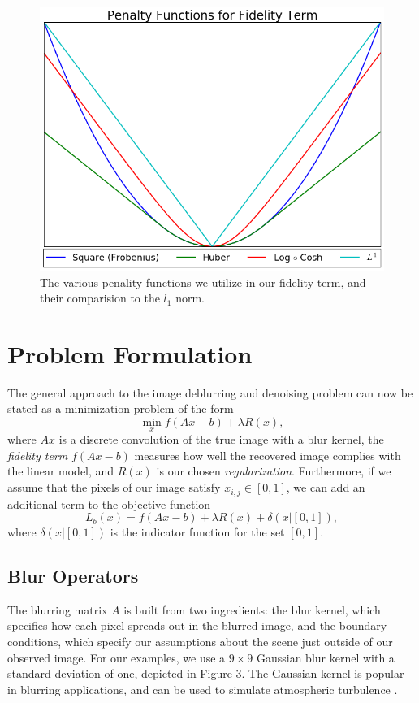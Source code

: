 \documentclass[10pt,a4paper]{article}
\begin{document}
	\begin{figure}[H]
		\centering
		\includegraphics[scale=.35]{../figures/penalty_functions.png} 
		\caption{The various penality functions we utilize in our fidelity term, and their comparision to the $l_1$ norm.}
	\end{figure}
	
	\newpage
	\section{Problem Formulation}
	The general approach to the image deblurring and denoising problem can now be stated as a minimization problem of the form
	\begin{equation} \label{general}
	\min_x f(Ax -b) + \lambda R(x),
	\end{equation}
	where $Ax$ is a discrete convolution of the true image with a blur kernel, the  \emph{fidelity term} $f(Ax-b)$ measures how well the recovered image complies with the linear model, and $R(x)$ is our chosen \emph{regularization}. Furthermore, if we assume that the pixels of our image satisfy $x_{i,j} \in [0,1]$, we can add an additional term to the objective function
	\begin{equation} \label{loss}
	L_b(x) = f(Ax-b) + \lambda R(x) + \delta(x | [0,1] ),
	\end{equation}
	where $\delta(x | [0,1])$ is the indicator function for the set $[0,1]$. 
	
	\subsection{Blur Operators}
	The blurring matrix $A$ is built from two ingredients: the blur kernel, which specifies how each pixel spreads out in the blurred image, and the boundary conditions, which specify our assumptions about the scene just outside of our observed image. For our examples, we use a $9 \times 9$ Gaussian blur kernel with a standard deviation of one, depicted in Figure 3. The Gaussian kernel is popular in blurring applications, and can be used to simulate atmospheric turbulence \cite{DeblurBook}. 
	
\end{document}
